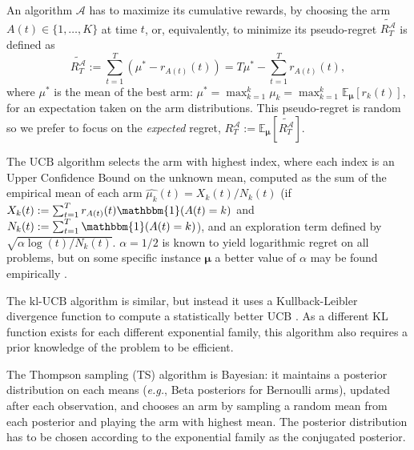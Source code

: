 \documentclass[conference]{IEEEtran}
\theoremstyle{plain}  %
\newcommand{\E}[0]{\mathbb{E}}
\newcommand{\eg}{\emph{e.g.}}
\newcommand{\UCB}[0]{$\mathrm{UCB}$}
\newcommand{\klUCB}[0]{$\mathrm{kl}$-$\mathrm{UCB}$}
\newcommand{\Alg}[0]{\mathcal{A}}
\begin{document}
%
%
An algorithm $\Alg$ has to maximize its cumulative rewards, by choosing the arm $A(t) \in \{1,\dots,K\}$ at time $t$,
or, equivalently, to minimize
its pseudo-regret $\widetilde{R_T^{\Alg}}$ is defined as
\begin{equation}\label{eq:classicalregret}
	\widetilde{R_T^{\Alg}} := \sum_{t=1}^{T} \left( \mu^* - r_{A(t)}(t) \right) = T \mu^* - \sum_{t=1}^{T} r_{A(t)}(t),
\end{equation}
where $\mu^*$ is the mean of the best arm: $\mu^* = \max_{k=1}^k \mu_k = \max_{k=1}^k \E_{\boldsymbol{\mu}}[ r_k(t) ]$, for an expectation taken on the arm distributions.
This pseudo-regret is random so we prefer to focus on the \emph{expected} regret,
$ R_T^{\Alg} := \E_{\boldsymbol{\mu}}[ \widetilde{R_T^{\Alg}} ]$.

The \UCB{} algorithm \cite{Auer02} selects the arm with highest index,
where each index is an Upper Confidence Bound on the unknown mean, computed as the sum of the empirical mean of each arm $\hat{\mu_k}(t) = X_k(t) / N_k(t)$
(if $X_k(t) := \sum_{t=1}^{T} r_{A(t)}(t) \mathbbm{1}(A(t) = k)$ and $N_k(t) := \sum_{t=1}^{T} \mathbbm{1}(A(t) = k)$),
and an exploration term defined by $\sqrt{\alpha \log(t) / N_k(t)}$.
$\alpha=1/2$ is known to yield logarithmic regret on all problems, but on some specific instance $\boldsymbol{\mu}$ a better value of $\alpha$ may be found empirically
\cite{Bubeck12}.

The \klUCB{} algorithm is similar, but instead it uses a Kullback-Leibler divergence function to compute a statistically better UCB \cite{Garivier11KL}.
As a different KL function exists for each different exponential family, this algorithm also requires a prior knowledge of the problem to be efficient.

The Thompson sampling (TS) \cite{Thompson33} algorithm is Bayesian: it maintains a posterior distribution on each means (\eg, Beta posteriors for Bernoulli arms), updated after each observation, and chooses an arm by sampling a random mean from each posterior and playing the arm with highest mean.
The posterior distribution has to be chosen according to the exponential family as the conjugated posterior.
\end{document}

